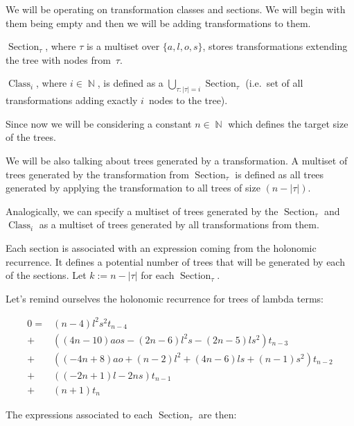\documentclass[final]{article}
\theoremstyle{definition}
\theoremstyle{definition}
\theoremstyle{remark}
\DeclareMathOperator{\N}{\mathbb{N}}
\DeclareMathOperator{\tClass}{\text{Class}}
\DeclareMathOperator{\tSection}{\text{Section}}
\begin{document}
We will be operating on transformation classes and sections. We will begin with them being empty and then we will be adding transformations to them.

\(\tSection_\tau\), where \(\tau\) is a multiset over \(\{a, l, o, s\}\), stores transformations extending the tree with nodes from~\(\tau\).

\(\tClass_i\), where \(i \in \N\), is defined as a \(\bigcup_{\tau : |\tau| = i} \tSection_\tau\) (i.e.~set of all transformations adding exactly \(i\)~nodes to the tree).

Since now we will be considering a constant \(n \in \N\) which defines the target size of the trees.

We will be also talking about trees generated by a transformation. A multiset of trees generated by the transformation from \(\tSection_\tau\) is defined as all trees generated by applying the transformation to all trees of size \((n - |\tau|)\).

Analogically, we can specify a multiset of trees generated by the \(\tSection_\tau\) and \(\tClass_i\) as a multiset of trees generated by all transformations from them.

Each section is associated with an expression coming from the holonomic recurrence. It defines a potential number of trees that will be generated by each of the sections. Let \(k := n - |\tau|\) for each \(\tSection_\tau\).

Let's remind ourselves the holonomic recurrence for trees of lambda terms:

\[\begin{array}{rl}
        0 =& (n - 4) l^2 s^2 t_{n - 4}\\
        +& ((4 n - 10) a o s - (2 n - 6) l^2 s - (2 n - 5) l s^2) t_{n - 3}\\
        +& ((-4 n + 8) a o + (n - 2) l^2 + (4 n - 6) l s + (n - 1) s^2) t_{n - 2}\\
        +& ((-2 n + 1) l - 2 n s) t_{n - 1}\\
        +& (n + 1) t_{n}
\end{array}\]

The expressions associated to each \(\tSection_\tau\) are then:
\end{document}
